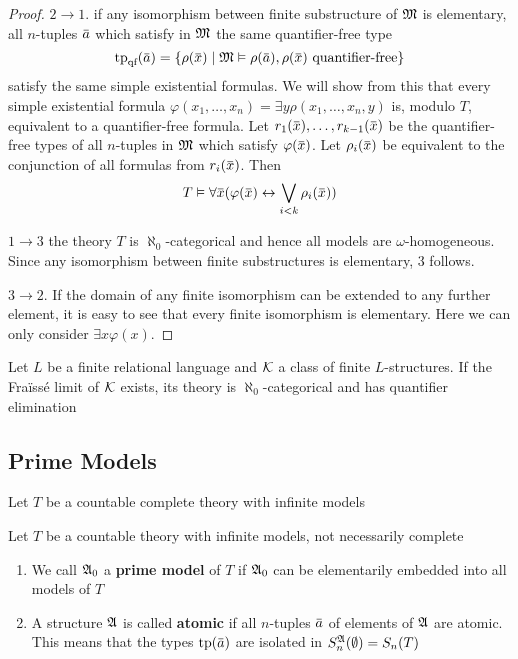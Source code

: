 \documentclass[11pt]{article}
\def \qf {\text{qf}}
\begin{document}
\begin{proof}
\(2\to 1\). if any isomorphism between finite substructure of \(\mathfrak{M}\) is elementary,
all \(n\)-tuples \(\bara\) which satisfy in \(\mathfrak{M}\) the same quantifier-free type
\begin{equation*}
\tp_{\qf}(\bara)=\{\rho(\barx)\mid\fM\vDash\rho(\bara),\rho(\barx)\text{ quantifier-free}\}
\end{equation*}
satisfy the same simple existential formulas. We will show from this that every simple
existential formula \(\varphi(x_1,\dots,x_n)=\exists y\rho(x_1,\dots,x_n,y)\) is, modulo \(T\), equivalent to a
quantifier-free formula. Let \(r_1(\barx),\dots,r_{k-1}(\barx)\) be the quantifier-free types of
all \(n\)-tuples in \(\mathfrak{M}\) which satisfy \(\varphi(\barx)\). Let \(\rho_i(\barx)\) be equivalent to the
conjunction of all formulas from \(r_i(\barx)\). Then
\begin{equation*}
T\vDash\forall \barx(\varphi(\barx)\leftrightarrow\bigvee_{i<k}\rho_i(\barx))
\end{equation*}


\(1\to 3\) the theory \(T\) is \(\aleph_0\)-categorical and hence all models are \(\omega\)-homogeneous. Since
any isomorphism between finite substructures is elementary, 3 follows.

\(3\to 2\). If the domain of any finite isomorphism can be extended to any further element, it is
easy to see that every finite isomorphism is elementary. Here we can only consider \(\exists x\varphi(x)\).
\end{proof}

\begin{theorem}[]
Let \(L\) be a finite relational language and \(\mathcal{K}\) a class of finite \(L\)-structures. If the
Fraïssé limit of \(\mathcal{K}\) exists, its theory is \(\aleph_0\)-categorical and has quantifier elimination
\end{theorem}

\subsection{Prime Models}
\label{sec:org2ba39cf}
Let \(T\) be a countable complete theory with infinite models
\begin{definition}[]
Let \(T\) be a countable theory with infinite models, not necessarily complete
\begin{enumerate}
\item We call \(\mathfrak{A}_0\) a \textbf{prime model} of \(T\) if \(\mathfrak{A}_0\) can be elementarily embedded into all
models of \(T\)
\item A structure \(\mathfrak{A}\) is called \textbf{atomic} if all \(n\)-tuples \(\bara\) of elements of \(\mathfrak{A}\) are
atomic. This means that the types \(\tp(\bara)\) are isolated in \(S_n^{\mathfrak{A}}(\emptyset)=S_n(T)\)
\end{enumerate}
\end{definition}
\end{document}
